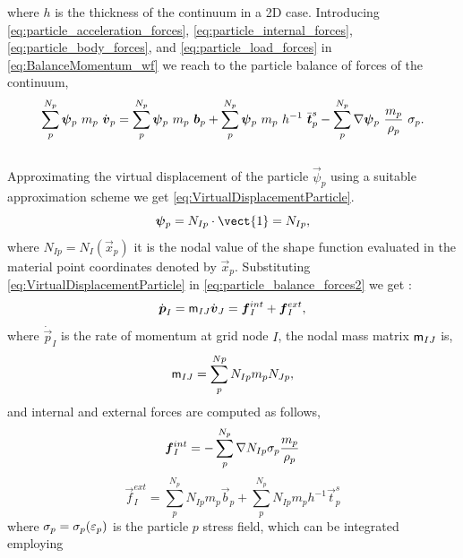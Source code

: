 where $h$ is the thickness of the continuum in a 2D case. Introducing \eqref{eq:particle_acceleration_forces},
\eqref{eq:particle_internal_forces}, \eqref{eq:particle_body_forces},
and \eqref{eq:particle_load_forces} in \eqref{eq:BalanceMomentum_wf}
we reach to the particle balance of forces of the continuum,
\begin{equation}
  \label{eq:particle_balance_forces2}
  \sum^{N_p}_{p}\vec{\psi}_{p}\ m_p\ \dot{\vec{v}}_{p} = \sum^{N_p}_{p}
  \vec{\psi}_{p}\ m_p\ \vec{b}_{p} + \sum^{N_p}_{p}
  \vec{\psi}_{p}\ m_p\ h^{-1}\ \bar{\vec{t}}^s_{p} -
  \sum^{N_p}_{p} \Grad{\vec{\psi}_{p}}\ \frac{m_p}{\rho_p}\
  \tens{\sigma}_{p}.
\end{equation}\\

Approximating the virtual displacement of the particle $\vec{\psi}_{p}$
using a suitable approximation scheme we get \eqref{eq:VirtualDisplacementParticle}.
\begin{equation}
  \label{eq:VirtualDisplacementParticle}
  \vec{\psi}_{p} = N_{Ip}\cdot \vect{1} = N_{Ip},
\end{equation}
where $N_{Ip} = N_I(\vec{x}_p)$ it is the nodal value of the shape
function evaluated in the material point coordinates denoted by $\vec{x}_p$. Substituting \eqref{eq:VirtualDisplacementParticle} in
\eqref{eq:particle_balance_forces2} we get :
\begin{equation}
  \label{eq:particle_balance_forces3}
  \dot{\vec{p}}_{I}= \tens{m}_{IJ}\dot{\vec{v}}_{J} = \vec{f}_{I}^{int} + \vec{f}_{I}^{ext},
\end{equation}
where $\dot{\vec{p}}_{I}$ is the rate of momentum at grid node $I$, the nodal mass matrix $\mathsf{m}_{IJ}$ is,
\begin{equation}
  \label{eq:particle_nod_mass}
  \mathsf{m}_{IJ} =
  \sum^{Np}_{p} N_{Ip} m_p N_{Jp},
\end{equation}
and internal and external forces are computed as follows,
\begin{equation}
  \label{eq:nodal_internal_forces}
  \vec{f}_{I}^{int} = - \sum^{N_p}_{p} \Grad{N_{Ip}}
  \tens{\sigma}_{p} \frac{m_p}{\rho_p}
\end{equation}
\begin{equation}
  \label{eq:nodal_external_forces}
  \vec{f}_{I}^{ext} = \sum^{N_p}_{p} N_{Ip} m_p \vec{b}_{p} + \sum^{N_p}_{p}
  N_{Ip} m_p h^{-1} \vec{t}^s_{p}
\end{equation}
where $\mathsf{\sigma}_{p} = \mathsf{\sigma}_{p}(\mathsf{\varepsilon}_{p})$
is the particle $p$ stress field, which can be integrated employing
